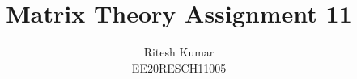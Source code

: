 \documentclass[journal,12pt,twocolumn]{IEEEtran}
\DeclareMathOperator*{\Res}{Res}
\begin{document}
	
	
	\newtheorem{theorem}{Theorem}[section]
	\newtheorem{problem}{Problem}
	\newtheorem{proposition}{Proposition}[section]
	\newtheorem{lemma}{Lemma}[section]
	\newtheorem{corollary}[theorem]{Corollary}
	\newtheorem{example}{Example}[section]
	\newtheorem{definition}[problem]{Definition}
	
	\newcommand{\BEQA}{\begin{eqnarray}}
	\newcommand{\EEQA}{\end{eqnarray}}
	\newcommand{\define}{\stackrel{\triangle}{=}}
	
	\providecommand{\mbf}{\mathbf}
	\providecommand{\pr}[1]{\ensuremath{\Pr\left(#1\right)}}
	\providecommand{\qfunc}[1]{\ensuremath{Q\left(#1\right)}}
	\providecommand{\sbrak}[1]{\ensuremath{{}\left[#1\right]}}
	\providecommand{\lsbrak}[1]{\ensuremath{{}\left[#1\right.}}
	\providecommand{\rsbrak}[1]{\ensuremath{{}\left.#1\right]}}
	\providecommand{\brak}[1]{\ensuremath{\left(#1\right)}}
	\providecommand{\lbrak}[1]{\ensuremath{\left(#1\right.}}
	\providecommand{\rbrak}[1]{\ensuremath{\left.#1\right)}}
	\providecommand{\cbrak}[1]{\ensuremath{\left\{#1\right\}}}
	\providecommand{\lcbrak}[1]{\ensuremath{\left\{#1\right.}}
	\providecommand{\rcbrak}[1]{\ensuremath{\left.#1\right\}}}
	\theoremstyle{remark}
	\newtheorem{rem}{Remark}
	\newcommand{\sgn}{\mathop{\mathrm{sgn}}}
	\providecommand{\abs}[1]{\left\vert#1\right\vert}
	\providecommand{\res}[1]{\Res\displaylimits_{#1}} 
	\providecommand{\norm}[1]{\left\lVert#1\right\rVert}
	\providecommand{\mtx}[1]{\mathbf{#1}}
	\providecommand{\mean}[1]{E\left[ #1 \right]}
	\providecommand{\fourier}{\overset{\mathcal{F}}{ \rightleftharpoons}}
	\providecommand{\system}{\overset{\mathcal{H}}{ \longleftrightarrow}}
	\newcommand{\solution}{\noindent \textbf{Solution: }}
	\newcommand{\cosec}{\,\text{cosec}\,}
	\providecommand{\dec}[2]{\ensuremath{\overset{#1}{\underset{#2}{\gtrless}}}}
	\newcommand{\myvec}[1]{\ensuremath{\begin{pmatrix}#1\end{pmatrix}}}
	\newcommand{\mydet}[1]{\ensuremath{\begin{vmatrix}#1\end{vmatrix}}}
	\makeatletter
	\makeatother
	\let\StandardTheFigure\thefigure
	\let\vec\mathbf
	\renewcommand{\thefigure}{\theproblem}
	\def\putbox#1#2#3{\makebox[0in][l]{\makebox[#1][l]{}\raisebox{\baselineskip}[0in][0in]{\raisebox{#2}[0in][0in]{#3}}}}
	\def\rightbox#1{\makebox[0in][r]{#1}}
	\def\centbox#1{\makebox[0in]{#1}}
	\def\topbox#1{\raisebox{-\baselineskip}[0in][0in]{#1}}
	\def\midbox#1{\raisebox{-0.5\baselineskip}[0in][0in]{#1}}
	\vspace{3cm}
	\title{Matrix Theory Assignment 11}
	\author{Ritesh Kumar \\ EE20RESCH11005}
	
\end{document}
